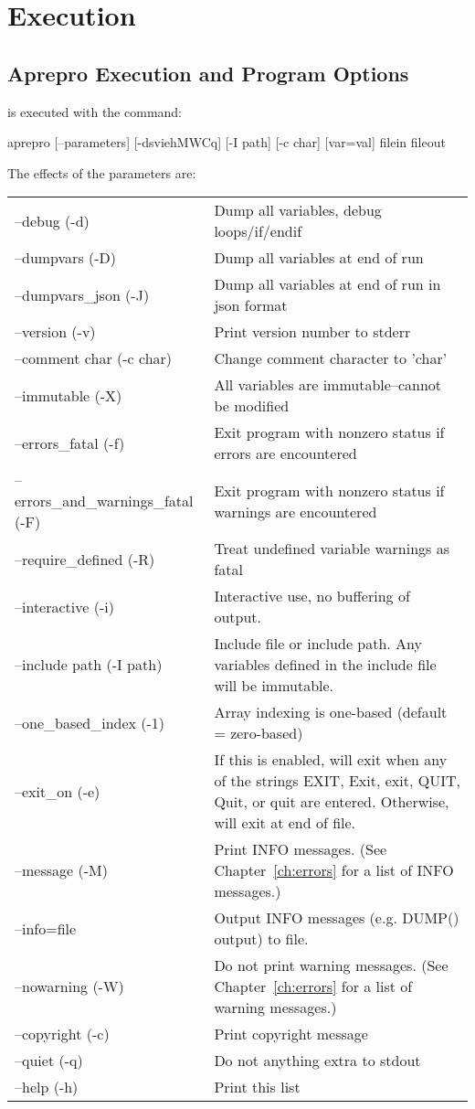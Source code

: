 \chapter{Execution}\label{ch:execution}

\section{Aprepro Execution and Program Options}
\aprepro{} is executed with the command:
\begin{apinp}
aprepro [--parameters] [-dsviehMWCq] [-I path] [-c char] [var=val] filein fileout
\end{apinp}

The effects of the parameters are:
\begin{longtable}{lp{5.0in}}
--debug (-d) &  Dump all variables, debug loops/if/endif \\
--dumpvars (-D) & Dump all variables at end of run \\
--dumpvars\_json (-J) & Dump all variables at end of run in json format \\
--version (-v) &  Print version number to stderr           \\
--comment char (-c char) &  Change comment character to 'char'       \\
--immutable (-X) &  All variables are immutable--cannot be modified \\
--errors\_fatal (-f) & Exit program with nonzero status if errors are encountered \\
--errors\_and\_warnings\_fatal (-F) & Exit program with nonzero status if warnings are encountered \\
--require\_defined (-R) & Treat undefined variable warnings as fatal \\
--interactive (-i) &  Interactive use, no buffering of output.       \\
--include path (-I path) &  Include file or include path. Any variables defined in the include file will be immutable.\\
--one\_based\_index (-1) & Array indexing is one-based (default = zero-based) \\
--exit\_on (-e) &  If this is enabled, \aprepro{} will exit when any of the strings
EXIT, Exit, exit, QUIT, Quit, or quit are entered. Otherwise, \aprepro{} will exit at end of
file. \\
--message (-M) &  Print INFO messages. (See Chapter~\ref{ch:errors} for a list of INFO messages.) \\
--info=file & Output INFO messages (e.g. DUMP() output) to file. \\
--nowarning (-W) &  Do not print warning messages. (See Chapter~\ref{ch:errors} for a list of warning messages.) \\
--copyright (-c) &  Print copyright message                  \\
--quiet (-q) &  Do not anything extra to stdout          \\
--help (-h) &  Print this list                          \\


\end{longtable}
